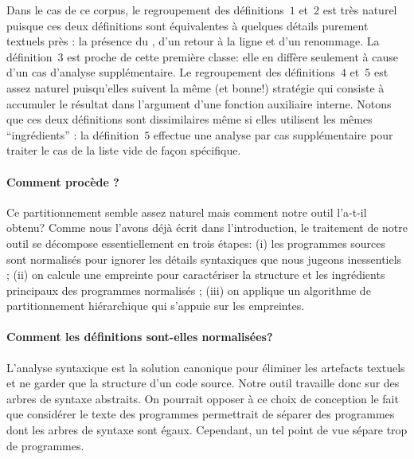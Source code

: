 Dans le cas de ce corpus, le regroupement des définitions~$1$ et~$2$
est très naturel puisque ces deux définitions sont équivalentes à
quelques détails purement textuels près : la présence du \iocaml{|},
d'un retour à la ligne et d'un renommage. La définition~$3$ est proche
de cette première classe: elle en diffère seulement à cause d'un cas
d'analyse supplémentaire. Le regroupement des définitions~$4$ et~$5$
est assez naturel puisqu'elles suivent la même (et bonne!) stratégie
qui consiste à accumuler le résultat dans l'argument d'une fonction
auxiliaire interne. Notons que ces deux définitions sont dissimilaires
même si elles utilisent les mêmes ``ingrédients'' : la définition~$5$
effectue une analyse par cas supplémentaire pour traiter le cas de la
liste vide de façon spécifique.


\paragraph{Comment procède {\Asak}?}
Ce partitionnement semble assez naturel mais comment
notre outil l'a-t-il obtenu? Comme nous l'avons déjà écrit dans
l'introduction, le traitement de notre outil se décompose
essentiellement en trois étapes: (i) les programmes sources sont
normalisés pour ignorer les détails syntaxiques que nous jugeons
inessentiels ; (ii) on calcule une empreinte pour caractériser la
structure et les ingrédients principaux des programmes normalisés ;
(iii) on applique un algorithme de partitionnement hiérarchique qui
s'appuie sur les empreintes.

\paragraph{Comment les définitions sont-elles normalisées?}
L'analyse syntaxique est la solution canonique pour éliminer les
artefacts textuels et ne garder que la structure d'un code source.
Notre outil travaille donc sur des arbres de syntaxe abstraits.  On
pourrait opposer à ce choix de conception le fait que considérer le
texte des programmes permettrait de séparer des programmes dont les
arbres de syntaxe sont égaux. Cependant, un tel point de vue sépare
trop de programmes.


